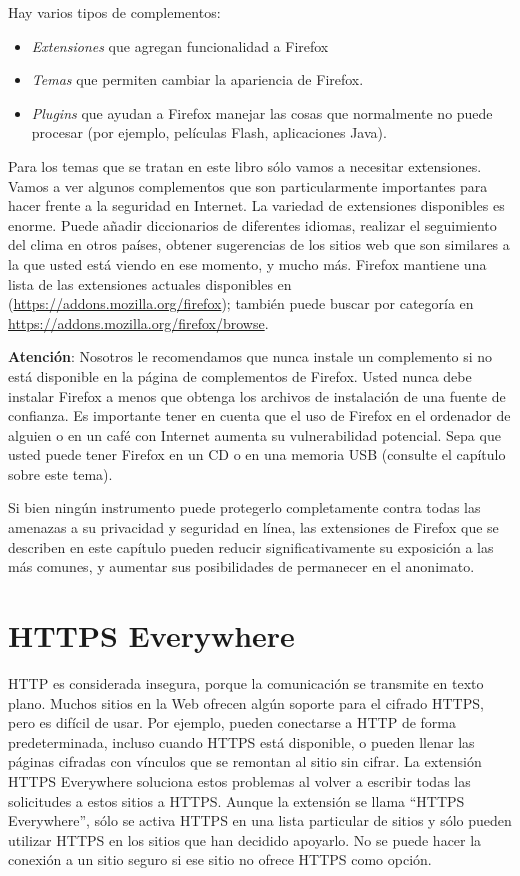 \documentclass[10pt,a5paper,twoside,,]{book}
\providecommand{\tightlist}{%
  \setlength{\itemsep}{0pt}\setlength{\parskip}{0pt}}
\begin{document}
Hay varios tipos de complementos:

\begin{itemize}
\tightlist
\item
  \emph{Extensiones} que agregan funcionalidad a Firefox
\item
  \emph{Temas} que permiten cambiar la apariencia de Firefox.
\item
  \emph{Plugins} que ayudan a Firefox manejar las cosas que normalmente
  no puede procesar (por ejemplo, películas Flash, aplicaciones Java).
\end{itemize}

Para los temas que se tratan en este libro sólo vamos a necesitar
extensiones. Vamos a ver algunos complementos que son particularmente
importantes para hacer frente a la seguridad en Internet. La variedad de
extensiones disponibles es enorme. Puede añadir diccionarios de
diferentes idiomas, realizar el seguimiento del clima en otros países,
obtener sugerencias de los sitios web que son similares a la que usted
está viendo en ese momento, y mucho más. Firefox mantiene una lista de
las extensiones actuales disponibles en
(\url{https://addons.mozilla.org/firefox}); también puede buscar por
categoría en \url{https://addons.mozilla.org/firefox/browse}.

\textbf{Atención}: Nosotros le recomendamos que nunca instale un
complemento si no está disponible en la página de complementos de
Firefox. Usted nunca debe instalar Firefox a menos que obtenga los
archivos de instalación de una fuente de confianza. Es importante tener
en cuenta que el uso de Firefox en el ordenador de alguien o en un café
con Internet aumenta su vulnerabilidad potencial. Sepa que usted puede
tener Firefox en un CD o en una memoria USB (consulte el capítulo sobre
este tema).

Si bien ningún instrumento puede protegerlo completamente contra todas
las amenazas a su privacidad y seguridad en línea, las extensiones de
Firefox que se describen en este capítulo pueden reducir
significativamente su exposición a las más comunes, y aumentar sus
posibilidades de permanecer en el anonimato.

\section{HTTPS Everywhere}\label{https-everywhere}

HTTP es considerada insegura, porque la comunicación se transmite en
texto plano. Muchos sitios en la Web ofrecen algún soporte para el
cifrado HTTPS, pero es difícil de usar. Por ejemplo, pueden conectarse a
HTTP de forma predeterminada, incluso cuando HTTPS está disponible, o
pueden llenar las páginas cifradas con vínculos que se remontan al sitio
sin cifrar. La extensión HTTPS Everywhere soluciona estos problemas al
volver a escribir todas las solicitudes a estos sitios a HTTPS. Aunque
la extensión se llama ``HTTPS Everywhere'', sólo se activa HTTPS en una
lista particular de sitios y sólo pueden utilizar HTTPS en los sitios
que han decidido apoyarlo. No se puede hacer la conexión a un sitio
seguro si ese sitio no ofrece HTTPS como opción.
\end{document}

